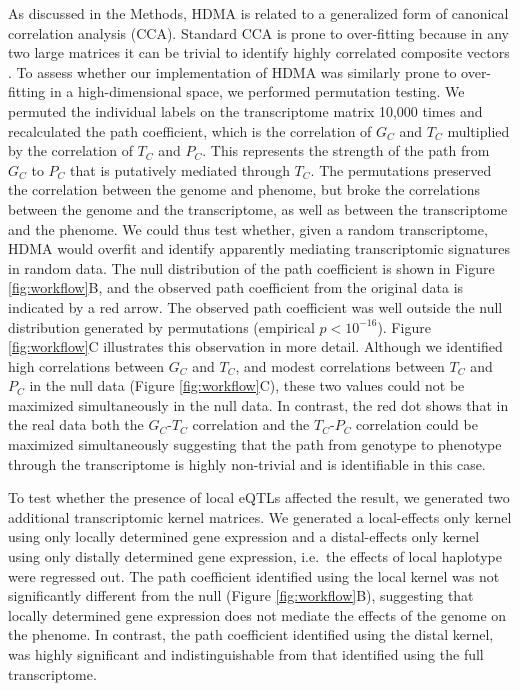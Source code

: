 \documentclass[
]{article}
\begin{document}
As discussed in the Methods, HDMA is related to a generalized form of
canonical correlation analysis (CCA). Standard CCA is prone to
over-fitting because in any two large matrices it can be trivial to
identify highly correlated composite vectors \cite{pmid38383808}. To
assess whether our implementation of HDMA was similarly prone to
over-fitting in a high-dimensional space, we performed permutation
testing. We permuted the individual labels on the transcriptome matrix
10,000 times and recalculated the path coefficient, which is the
correlation of \(G_C\) and \(T_C\) multiplied by the correlation of
\(T_C\) and \(P_C\). This represents the strength of the path from
\(G_C\) to \(P_C\) that is putatively mediated through \(T_C\). The
permutations preserved the correlation between the genome and phenome,
but broke the correlations between the genome and the transcriptome, as
well as between the transcriptome and the phenome. We could thus test
whether, given a random transcriptome, HDMA would overfit and identify
apparently mediating transcriptomic signatures in random data. The null
distribution of the path coefficient is shown in Figure
\ref{fig:workflow}B, and the observed path coefficient from the original
data is indicated by a red arrow. The observed path coefficient was well
outside the null distribution generated by permutations (empirical
\(p < 10^{-16}\)). Figure \ref{fig:workflow}C illustrates this
observation in more detail. Although we identified high correlations
between \(G_C\) and \(T_C\), and modest correlations between \(T_C\) and
\(P_C\) in the null data (Figure \ref{fig:workflow}C), these two values
could not be maximized simultaneously in the null data. In contrast, the
red dot shows that in the real data both the \(G_C\)-\(T_C\) correlation
and the \(T_C\)-\(P_C\) correlation could be maximized simultaneously
suggesting that the path from genotype to phenotype through the
transcriptome is highly non-trivial and is identifiable in this case.

To test whether the presence of local eQTLs affected the result, we
generated two additional transcriptomic kernel matrices. We generated a
local-effects only kernel using only locally determined gene expression
and a distal-effects only kernel using only distally determined gene
expression, i.e.~the effects of local haplotype were regressed out. The
path coefficient identified using the local kernel was not significantly
different from the null (Figure \ref{fig:workflow}B), suggesting that
locally determined gene expression does not mediate the effects of the
genome on the phenome. In contrast, the path coefficient identified
using the distal kernel, was highly significant and indistinguishable
from that identified using the full transcriptome.
\end{document}
